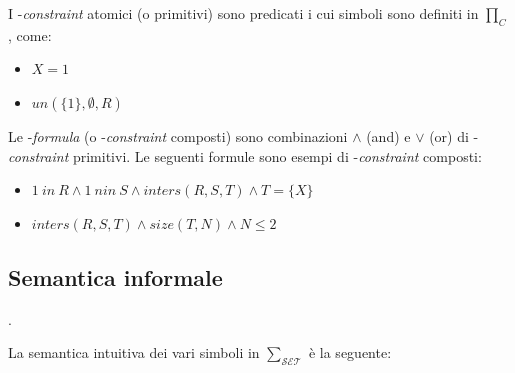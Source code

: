 \documentclass[12pt,a4paper,openright]{book} %
\begin{document}
I \calset{}-\textit{constraint} atomici (o primitivi) sono predicati i cui simboli sono definiti in $\prod_C$, come:
\begin{itemize}
\item $X = 1$
\item $un(\{1\}, \emptyset, R)$
\end{itemize}
    
Le \calset{}-\textit{formula} (o \calset{}-\textit{constraint} composti) sono combinazioni $\wedge$ (and) e $\vee$ (or) di \calset{}-\textit{constraint} primitivi. Le seguenti formule sono esempi di \calset{}-\textit{constraint} composti:
\begin{itemize}
\item $1\ in\ R \land 1\ nin\ S \land inters(R,S,T) \land T = \{X\}$
\item $inters(R, S, T) \land size(T, N) \land N \leq 2$
\end{itemize}

\subsection{Semantica informale}.
\label{subsec:lang_lset_semantics}

La semantica intuitiva dei vari simboli in $\sum_{\mathcal{SET}}$ è la seguente:
\end{document}
